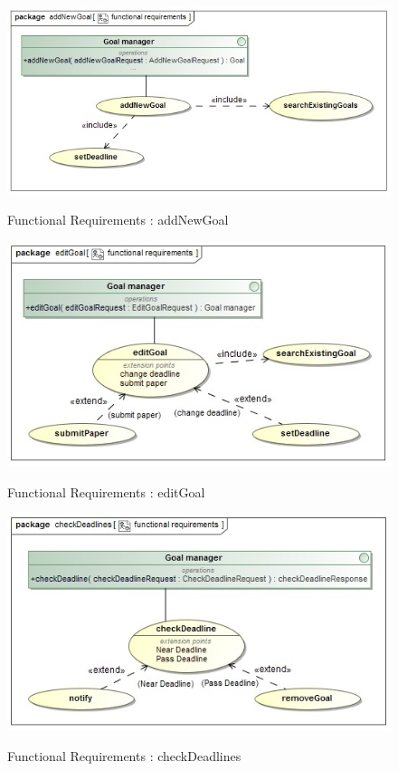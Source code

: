 \documentclass{article}
\begin{document}
		\begin{figure}[H]
			\includegraphics[width=\textwidth]{Ruan_Diagrams/addNewGoal_functionalRequirements.jpg}  \\
			\caption{Functional Requirements : addNewGoal}
		\end{figure}
		\begin{figure}[H]
			\includegraphics[width=\textwidth]{Ruan_Diagrams/editGoal_functionalRequirements.jpg}  \\
			\caption{Functional Requirements : editGoal}
		\end{figure}
		\begin{figure}[H]
			\includegraphics[width=\textwidth]{Ruan_Diagrams/checkDeadline_functionalRequirements.jpg}  \\
			\caption{Functional Requirements : checkDeadlines}
		\end{figure}
\end{document}
